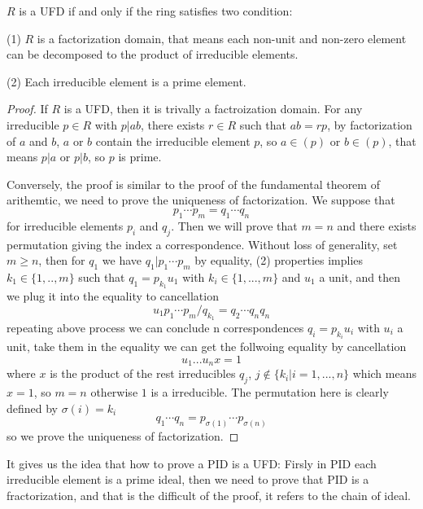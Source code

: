 \documentclass[en,geye,blue,normal,12pt]{elegantnote}
\begin{document}
\begin{theorem}
  \(R\) is a UFD if and only if the ring satisfies two condition:

  (1) \(R\) is a factorization domain, that means each non-unit and non-zero element can be decomposed to the product of irreducible elements.

  (2) Each irreducible element is a prime element.

  \begin{proof}
    If \(R\) is a UFD, then it is trivally a factroization domain. For any irreducible \(p \in R\) with \(p|ab\), there exists \(r \in R\) such that \(ab=rp\), by factorization of \(a\) and \(b\), \(a\) or \(b\) contain the irreducible element \(p\), so \(a \in (p)\) or \(b \in (p)\), that means \(p|a\) or \(p|b\), so \(p\) is prime.

    Conversely, the proof is similar to the proof of the fundamental theorem of arithemtic, we need to prove the uniqueness of factorization. We suppose that \[p_1\cdots p_m = q_1 \cdots q_n\] for irreducible elements \(p_i\) and \(q_j\). Then we will prove that \(m=n\) and there exists permutation giving the index a correspondence. Without loss of generality, set \(m \geq n\), then for \(q_1\) we have \(q_1|p_1\cdots p_m\) by equality, (2) properties implies \(k_1 \in \{1,..,m\}\) such that \(q_1=p_{k_1}u_1\) with \(k_i \in \{1,...,m\}\) and \(u_1\) a unit, and then we plug it into the equality to cancellation
    \[u_1p_1 \cdots p_m/q_{k_1} = q_2\cdots q_nq_n \]repeating above process we can conclude n correspondences \(q_i = p_{k_i}u_i\) with \(u_i\) a unit, take them in the equality we can get the follwoing equality by cancellation 
    \[u_1...u_nx = 1\]
    where \(x\) is the product of the rest irreducibles \(q_j\), \(j \notin \{k_i|i=1,...,n\}\) which means \(x=1\), so \(m=n\) otherwise \(1\) is a irreducible. The permutation here is clearly defined by \(\sigma(i) = k_i\)
    \[q_1\cdots q_n = p_{\sigma(1)}\cdots p_{\sigma(n)}\]
    so we prove the uniqueness of factorization.
  \end{proof}
\end{theorem}

\begin{remark}
  It gives us the idea that how to prove a PID is a UFD: Firsly in PID each irreducible element is a prime ideal, then we need to prove that PID is a fractorization, and that is the difficult of the proof, it refers to the chain of ideal.
\end{remark}
\end{document}
